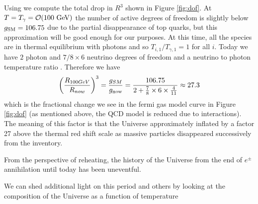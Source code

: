 Using  we compute the total drop in $R^3$ shown in Figure \ref{fig:dof}. At $T=T_\gamma=\mathcal{O}(100\text{ GeV})$ the number of active degrees of freedom is slightly below $g_{\rm SM}=106.75$ due to the partial disappearance of top quarks, but this approximation will be good enough for our purposes. At this time, all the species are in thermal equilibrium with photons and so $T_{i,1}/T_{\gamma,1}=1$ for all $i$. Today we have $2$ photon and $7/8\times 6$ neutrino degrees of freedom and a neutrino to photon temperature ratio . Therefore we have
\begin{equation}
\left(\frac{R_{100GeV}}{R_{now}}\right)^3= \frac{g_{SM}}{g_{\rm now}}=\frac{106.75}{2+\frac{7}{8}\times 6\times \frac{4}{11}}\approx 27.3
\end{equation}
which is the fractional change we see in the fermi gas model curve in Figure \ref{fig:dof} (as mentioned above, the QCD model is reduced due to interactions). The meaning of this factor is that the Universe approximately inflated by a factor 27 above the thermal red shift scale as massive particles disappeared successively from the inventory. 

From the perspective of reheating, the history of the Universe from the end of $e^\pm$ annihilation until today has been uneventful. 

We can shed additional light on this period and others by looking at the composition of the Universe as a function of temperature


